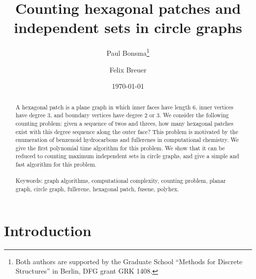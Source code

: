 \documentclass{llncs}
\begin{document}
\title{Counting hexagonal patches and independent sets in circle graphs}
\date{\today}


\author{Paul Bonsma\thanks{Both authors are supported by the Graduate School ``Methods for Discrete Structures'' in Berlin, DFG grant GRK 1408.} \and Felix Breuer}



\maketitle

\begin{abstract}
A hexagonal patch is a plane graph in which inner faces have length 6, inner vertices have degree 3, and boundary vertices have degree 2 or 3. 
We consider the following counting problem: given a sequence of twos and threes, how many hexagonal patches exist with this degree sequence along the outer face?
This problem is motivated by the enumeration of benzenoid hydrocarbons and fullerenes in computational chemistry.
We give the first polynomial time algorithm for this problem. We show that it can be reduced to counting maximum independent sets in circle graphs, and give a simple and fast algorithm for this problem.\\
\\
Keywords: graph algorithms, computational complexity, counting problem, planar graph, circle graph, fullerene, hexagonal patch, fusene, polyhex. 
\end{abstract}

\section{Introduction}
\end{document}
